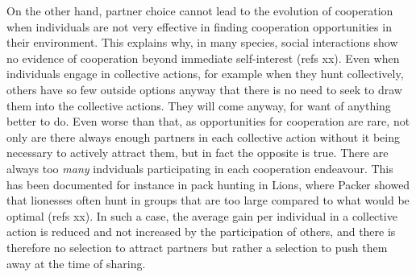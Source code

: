 On the other hand, partner choice cannot lead to the evolution of cooperation when individuals are not very effective in finding cooperation opportunities in their environment. This explains why, in many species, social interactions show no evidence of cooperation beyond immediate self-interest (refs xx). Even when individuals engage in collective actions, for example when they hunt collectively, others have so few outside options anyway that there is no need to seek to draw them into the collective actions. They will come anyway, for want of anything better to do. Even worse than that, as opportunities for cooperation are rare, not only are there always enough partners in each collective action without it being necessary to actively attract them, but in fact the opposite is true. There are always too \textit{many} indviduals participating in each cooperation endeavour. This has been documented for instance in pack hunting in Lions, where Packer showed that lionesses often hunt in groups that are too large compared to what would be optimal (refs xx). In such a case, the average gain per individual in a collective action is reduced and not increased by the participation of others, and there is therefore no selection to attract partners but rather a selection to push them away at the time of sharing.

